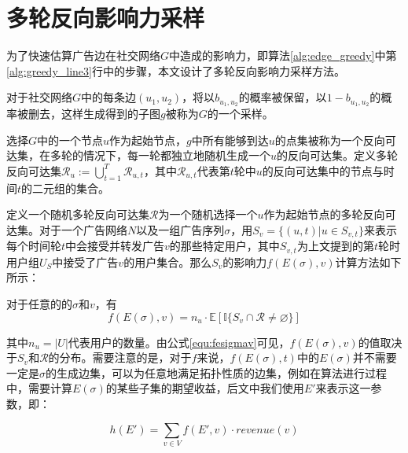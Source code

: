 \section{多轮反向影响力采样}
\label{sec:mrris}
为了快速估算广告边在社交网络$G$中造成的影响力，即算法\ref{alg:edge_greedy}中第\ref{alg:greedy_line3}行中的步骤，本文设计了多轮反向影响力采样方法。

对于社交网络$G$中的每条边$(u_1,u_2)$，将以$b_{u_1,u_2}$的概率被保留，以$1-b_{u_1,u_2}$的概率被删去，这样生成得到的子图$g$被称为$G$的一个采样。

选择$G$中的一个节点$u$作为起始节点，$g$中所有能够到达$u$的点集被称为一个反向可达集，在多轮的情况下，每一轮都独立地随机生成一个$u$的反向可达集。定义多轮反向可达集$\mathcal{R}_u := \bigcup_{t=1}^{T}\mathcal{R}_{u,t}$，其中$\mathcal{R}_{u,t}$代表第$t$轮中$u$的反向可达集中的节点与时间$t$的二元组的集合。

定义一个随机多轮反向可达集$\mathcal{R}$为一个随机选择一个$u$作为起始节点的多轮反向可达集。对于一个广告网络$N$以及一组广告序列$\sigma$，用$S_v =\{(u,t) | u\in S_{v,t}\}$来表示每个时间轮$t$中会接受并转发广告$v$的那些特定用户，其中$S_{v,t}$为上文提到的第$t$轮时用户组$U_S$中接受了广告$v$的用户集合。那么$S_v$的影响力$f(E(\sigma), v)$计算方法如下所示：

\begin{lemma}
对于任意的的$\sigma$和$v$，有
\begin{equation}
    \label{equ:fesigmav}
    f(E(\sigma), v)=n_u \cdot\mathbb{E}[\mathbb{I}\{S_v\cap\mathcal{R}\ne \varnothing \}]
\end{equation}
\end{lemma}
\noindent 其中$n_u=|U|$代表用户的数量。由公式\autoref{equ:fesigmav}可见，$f(E(\sigma),v)$的值取决于$S_v$和$\mathcal{R}$的分布。需要注意的是，对于$f$来说，$f(E(\sigma),t)$中的$E(\sigma)$并不需要一定是$\sigma$的生成边集，可以为任意地满足拓扑性质的边集，例如在算法进行过程中，需要计算$E(\sigma)$的某些子集的期望收益，后文中我们使用$E'$来表示这一参数，即：

\begin{equation}
    h(E')=\sum_{v \in V}f(E',v)\cdot revenue(v)
\end{equation}


